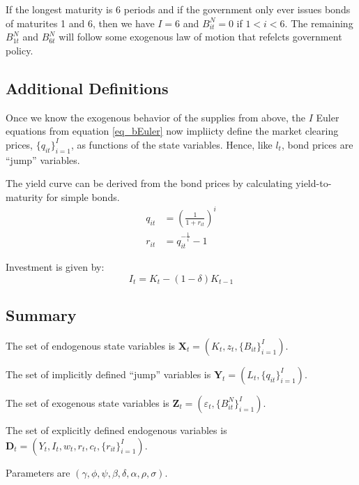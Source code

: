 \documentclass[letterpaper,11pt]{article}
\theoremstyle{definition}
\numberwithin{equation}{section}
\newcommand\ve{\varepsilon}
\begin{document}
\begin{spacing}{1.5}
		If the longest maturity is 6 periods and if the government only ever issues bonds of maturites 1 and 6, then we have $I=6$ and $B^N_{it} = 0$ if $1 < i < 6$.  The remaining $B^N_{1t}$ and $B^N_{6t}$ will follow some exogenous law of motion that refelcts government policy.

	\subsection{Additional Definitions}

		Once we know the exogenous behavior of the supplies from above, the $I$ Euler equations from equation \eqref{eq_bEuler} now impliicty define the market clearing prices, $\{ q_{it} \}_{i=1}^I$, as functions of the state variables.  Hence, like $l_t$, bond prices are ``jump'' variables.

		The yield curve can be derived from the bond prices by calculating yield-to-maturity for simple bonds.
		\begin{align}
			q_{it} & = \left( \frac{1}{1+r_{it}} \right)^i \nonumber \\
			r_{it} & = q_{it}^{-\frac{1}{i}} - 1 \label{eq_ridef}
		\end{align}

		Investment is given by:
		\begin{equation}
			I_t = K_t - (1-\delta)K_{t-1}
		\end{equation}

	\subsection{Summary}
		The set of endogenous state variables is $\mathbf{X}_t = (K_t, z_t, \{B_{it}\}_{i=1}^I)$.

		The set of implicitly defined ``jump'' variables is $\mathbf{Y}_t = (L_t, \{q_{it}\}_{i=1}^I)$.

		The set of exogenous state variables is $\mathbf{Z}_t = (\ve_t, \{B^N_{it}\}_{i=1}^I)$.

		The set of explicitly defined endogenous variables is $\mathbf{D}_t = (Y_t, I_t, w_t, r_t, c_t, \{r_{it}\}_{i=1}^I).$

		Parameters are $(\gamma, \phi, \psi, \beta, \delta, \alpha, \rho, \sigma)$.


\end{spacing}
\end{document}
